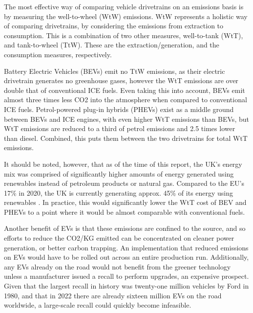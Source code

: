 \documentclass [12pt]{article}
\begin{document}
The most effective way of comparing vehicle drivetrains on an emissions basis is by measuring the well-to-wheel (WtW) emissions\cite{Well_To_Wheel}. WtW represents a holistic way of comparing drivetrains, by considering the emissions from extraction to consumption. This is a combination of two other measures, well-to-tank (WtT), and tank-to-wheel (TtW). These are the extraction/generation, and the consumption measures, respectively.

 Battery Electric Vehicles (BEVs) emit no TtW emissions, as their electric drivetrain generates no greenhouse gases, however the WtT emissions are over double that of conventional ICE fuels. Even taking this into account, BEVs emit almost three times less CO2 into the atmosphere when compared to conventional ICE fuels. Petrol-powered plug-in hybrids (PHEVs) exist as a middle ground between BEVs and ICE engines, with even higher WtT emissions than BEVs, but WtT emissions are reduced to a third of petrol emissions and 2.5 times lower than diesel. Combined, this puts them between the two drivetrains for total WtT emissions.

It should be noted, however, that as of the time of this report, the UK’s energy mix was comprised of significantly higher amounts of energy generated using renewables instead of petroleum products or natural gas. Compared to the EU’s 17\% in 2020\cite{Energy}, the UK is currently generating approx. 45\% of its energy using renewables \cite{Electricity_Generation}. In practice, this would significantly lower the WtT cost of BEV and PHEVs to a point where it would be almost comparable with conventional fuels.

Another benefit of EVs is that these emissions are confined to the source, and so efforts to reduce the CO2/KG emitted can be concentrated on cleaner power generation, or better carbon trapping. An implementation that reduced emissions on EVs would have to be rolled out across an entire production run. Additionally, any EVs already on the road would not benefit from the greener technology unless a manufacturer issued a recall to perform upgrades, an expensive prospect. Given that the largest recall in history was twenty-one million vehicles by Ford in 1980\cite{Ford_Transmission}, and that in 2022 there are already sixteen million EVs\cite{EV_on_Road} on the road worldwide, a large-scale recall could quickly become infeasible.
\end{document}
